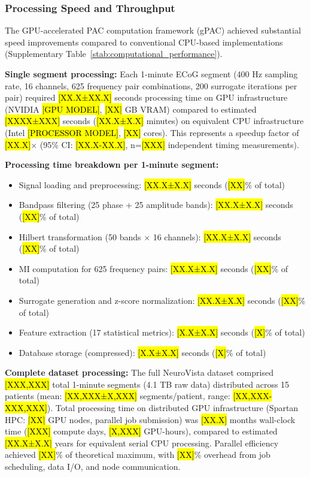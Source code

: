 \subsubsection{Processing Speed and Throughput}
The GPU-accelerated PAC computation framework (gPAC) achieved substantial speed improvements compared to conventional CPU-based implementations \cite{Combrisson2020TensorpacAOAH} (Supplementary Table~\ref{stab:computational_performance}).

\textbf{Single segment processing:} Each 1-minute ECoG segment (400 Hz sampling rate, 16 channels, 625 frequency pair combinations, 200 surrogate iterations per pair) required \hl{[XX.X±XX.X]} seconds processing time on GPU infrastructure (NVIDIA \hl{[GPU MODEL]}, \hl{[XX]} GB VRAM) compared to estimated \hl{[XXXX±XXX]} seconds (\hl{[XX.X±X.X]} minutes) on equivalent CPU infrastructure (Intel \hl{[PROCESSOR MODEL]}, \hl{[XX]} cores). This represents a speedup factor of \hl{[XX.X]}× (95\% CI: \hl{[XX.X-XX.X]}, n=\hl{[XXX]} independent timing measurements).

\textbf{Processing time breakdown per 1-minute segment:}
\begin{itemize}
\item Signal loading and preprocessing: \hl{[XX.X±X.X]} seconds (\hl{[XX]}\% of total)
\item Bandpass filtering (25 phase + 25 amplitude bands): \hl{[XX.X±X.X]} seconds (\hl{[XX]}\% of total)
\item Hilbert transformation (50 bands × 16 channels): \hl{[XX.X±X.X]} seconds (\hl{[XX]}\% of total)
\item MI computation for 625 frequency pairs: \hl{[XX.X±X.X]} seconds (\hl{[XX]}\% of total)
\item Surrogate generation and z-score normalization: \hl{[XX.X±X.X]} seconds (\hl{[XX]}\% of total)
\item Feature extraction (17 statistical metrics): \hl{[X.X±X.X]} seconds (\hl{[X]}\% of total)
\item Database storage (compressed): \hl{[X.X±X.X]} seconds (\hl{[X]}\% of total)
\end{itemize}

\textbf{Complete dataset processing:} The full NeuroVista dataset comprised \hl{[XXX,XXX]} total 1-minute segments (4.1 TB raw data) distributed across 15 patients (mean: \hl{[XX,XXX±X,XXX]} segments/patient, range: \hl{[XX,XXX-XXX,XXX]}). Total processing time on distributed GPU infrastructure (Spartan HPC: \hl{[XX]} GPU nodes, parallel job submission) was \hl{[XX.X]} months wall-clock time (\hl{[XXX]} compute days, \hl{[X,XXX]} GPU-hours), compared to estimated \hl{[XX.X±X.X]} years for equivalent serial CPU processing. Parallel efficiency achieved \hl{[XX]}\% of theoretical maximum, with \hl{[XX]}\% overhead from job scheduling, data I/O, and node communication.

